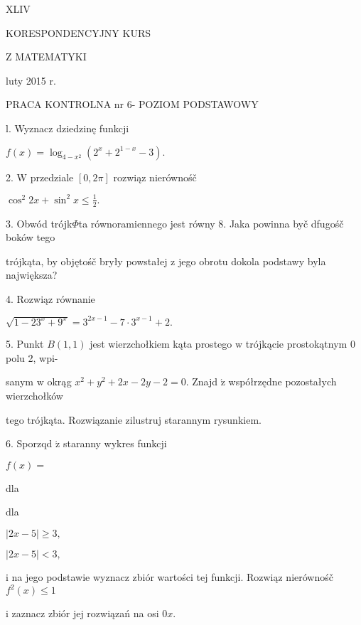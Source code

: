 \documentclass[a4paper,12pt]{article}
\begin{document}
XLIV

KORESPONDENCYJNY KURS

Z MATEMATYKI

luty 2015 r.

PRACA KONTROLNA nr 6- POZIOM PODSTAWOWY

l. Wyznacz dziedzinę funkcji

$f(x)=\log_{4-x^{2}}(2^{x}+2^{1-x}-3).$

2. $\mathrm{W}$ przedziale $[0,2\pi]$ rozwiąz nierównośč

$\displaystyle \cos^{2}2x+\sin^{2}x\leq\frac{1}{2}.$

3. Obwód trójk$\Phi$ta równoramiennego jest równy 8. Jaka powinna byč dfugośč boków tego

trójkąta, by objętośč bryły powstałej $\mathrm{z}$ jego obrotu dokola podstawy byla największa?

4. Rozwiąz równanie

$\sqrt{1-23^{x}+9^{x}}=3^{2x-1}-7\cdot 3^{x-1}+2.$

5. Punkt $B(1,1)$ jest wierzchołkiem kąta prostego $\mathrm{w}$ trójkącie prostokątnym $0$ polu 2, wpi-

sanym $\mathrm{w}$ okrąg $x^{2}+y^{2}+2x-2y-2=0.$ Znajd $\acute{\mathrm{z}}$ współrzędne pozostałych wierzchołków

tego trójkąta. Rozwiązanie zilustruj starannym rysunkiem.

6. Sporzqd $\acute{\mathrm{z}}$ staranny wykres funkcji

$f(x)=$

dla

dla

$|2x-5|\geq 3,$

$|2x-5|<3,$

$\mathrm{i}$ na jego podstawie wyznacz zbiór wartości tej funkcji. Rozwiąz nierównośč $f^{2}(x) \leq 1$

$\mathrm{i}$ zaznacz zbiór jej rozwiązań na osi $0x.$
\end{document}
